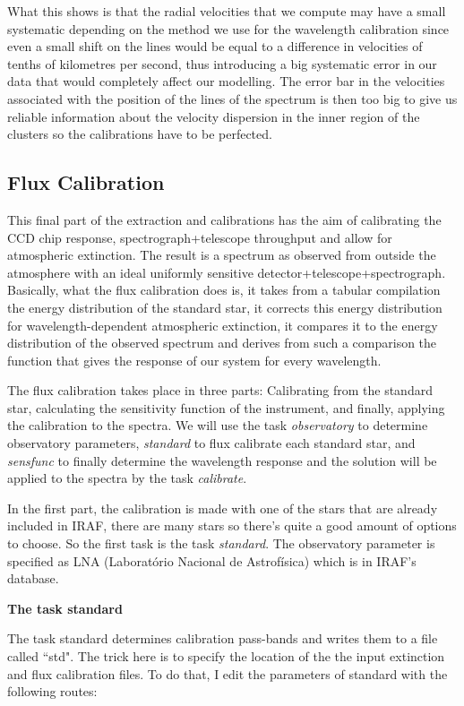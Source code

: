 What this shows is that the radial velocities that we compute may have a small systematic depending on the method we use for the wavelength calibration since even a small shift on the lines would be equal to a difference in velocities of tenths of kilometres per second, thus introducing a big systematic error in our data that would completely affect our modelling. The error bar in the velocities associated with the position of the lines of the spectrum is then too big to give us reliable information about the velocity dispersion in the inner region of the clusters so the calibrations have to be perfected.


\subsection{Flux Calibration}

This final part of the extraction and calibrations has the aim of calibrating the CCD chip response, spectrograph+telescope throughput and allow for atmospheric extinction. The result is a spectrum as observed from outside the atmosphere with an ideal uniformly sensitive detector+telescope+spectrograph. Basically, what the flux calibration does is, it takes from a tabular compilation the energy distribution of the standard star, it corrects this energy distribution for wavelength-dependent atmospheric extinction, it compares it to the energy distribution of the observed spectrum and derives from such a comparison the function that gives the response of our system for every wavelength.

The flux calibration takes place in three parts: Calibrating from the standard star, calculating the sensitivity function of the instrument, and finally, applying the calibration to the spectra. We will use the task \textit{observatory} to determine observatory parameters, \textit{standard} to flux calibrate each standard star, and \textit{sensfunc} to finally determine the wavelength response and the solution will be applied to the spectra by the task \textit{calibrate}.

In the first part, the calibration is made with one of the stars that are already included in IRAF, there are many stars so there's quite a good amount of options to choose. So the first task is the task \textit{standard}. The observatory parameter is specified as LNA (Laborat\'orio Nacional de Astrof\'isica) which is in IRAF's database. 

\textbf{The task standard}

The task standard determines calibration pass-bands and writes them to a file called ``std". The trick here is to specify the location of the the input extinction and flux calibration files. To do that, I edit the parameters of standard with the following routes:

